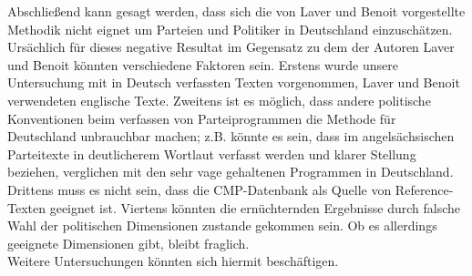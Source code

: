 Abschließend kann gesagt werden, dass sich die von Laver und Benoit vorgestellte Methodik nicht eignet um Parteien und Politiker in Deutschland einzuschätzen. Ursächlich für dieses negative Resultat im Gegensatz zu dem der Autoren Laver und Benoit könnten verschiedene Faktoren sein. Erstens wurde unsere Untersuchung mit in Deutsch verfassten Texten vorgenommen, Laver und Benoit verwendeten englische Texte. 
Zweitens ist es möglich, dass andere politische Konventionen beim verfassen von Parteiprogrammen die Methode für Deutschland unbrauchbar machen; z.B. könnte es sein, dass im angelsächsischen Parteitexte in deutlicherem Wortlaut verfasst werden und klarer Stellung beziehen, verglichen mit den sehr vage gehaltenen Programmen in Deutschland. 
Drittens muss es nicht sein, dass die CMP-Datenbank als Quelle von Reference-Texten geeignet ist.
Viertens könnten die ernüchternden Ergebnisse durch falsche Wahl der politischen Dimensionen zustande gekommen sein. Ob es allerdings geeignete Dimensionen gibt, bleibt fraglich.\\
Weitere Untersuchungen könnten sich hiermit beschäftigen.




